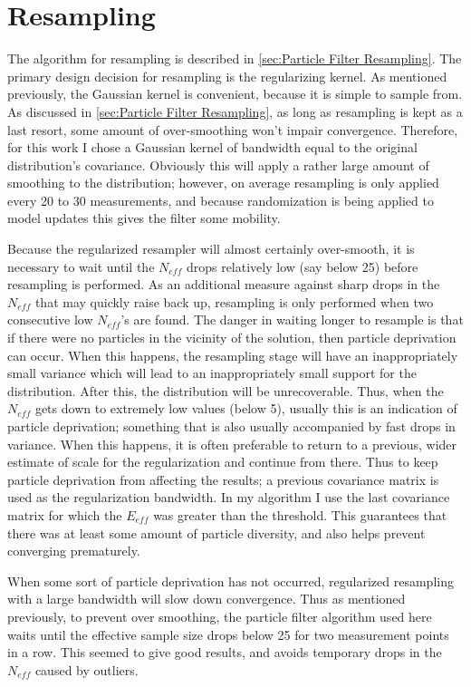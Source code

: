 \section{Resampling}
\label{sec:Resampling}
The algorithm for resampling is described in \autoref{sec:Particle Filter Resampling}.
The primary design decision for resampling is the regularizing
kernel. As mentioned previously, the Gaussian kernel is convenient,
because it is simple to sample from. As discussed in \autoref{sec:Particle Filter Resampling},
as long as resampling is kept as a last resort, some amount of over-smoothing
won't impair convergence. Therefore, for this work I chose a Gaussian kernel of
bandwidth equal to the original distribution's covariance. Obviously this will
apply a rather large amount of smoothing to the distribution; however, on average
resampling is only applied every 20 to 30 measurements, and because randomization
is being applied to model updates this gives the filter some mobility. 

Because the regularized resampler will almost certainly over-smooth,
it is necessary to wait until the $N_{eff}$ drops relatively low
(say below 25) before resampling is performed. As an additional 
measure against sharp drops in the $N_{eff}$ that may quickly raise
back up, resampling is only performed when two consecutive low
$N_{eff}$'s are found. 
The danger in waiting longer to resample is that if there were no
particles in the vicinity of the solution, then particle deprivation
can occur.  When this happens, the resampling
stage will have an inappropriately small variance which will lead to an 
inappropriately small support for the distribution. After this, the 
distribution will be unrecoverable. Thus, when the $N_{eff}$ gets down
to extremely low values (below 5), usually this is an indication of particle
deprivation; something that is also usually accompanied by 
fast drops in variance. When this happens, it is often preferable 
to return to a previous, wider estimate of scale for the regularization
and continue from there. Thus to keep particle deprivation from 
affecting the results; a previous covariance matrix is 
used as the regularization bandwidth. In my algorithm I use
the last covariance matrix for which the $E_{eff}$ was greater than
the threshold. This guarantees that there was at least some amount of 
particle diversity, and also helps prevent converging prematurely.

When some sort of particle deprivation has not occurred, regularized
resampling with a large bandwidth will slow down convergence. Thus
as mentioned previously, to prevent over smoothing, the particle
filter algorithm used here waits until 
the effective sample size drops below 25 for two measurement points
in a row. This seemed to give good results, and avoids
temporary drops in the $N_{eff}$ caused by outliers. 

